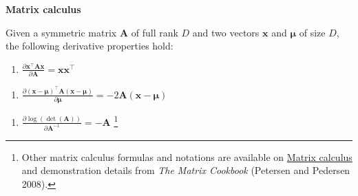 \hypertarget{properties-calculus}{}
\begin{blackbox}{\textbf{Matrix calculus}}

Given a symmetric matrix \(\boldsymbol{A}\) of full rank \(D\) and two vectors
\(\boldsymbol{x}\) and \(\boldsymbol{\mu}\) of size \(D\), the following derivative
properties hold:

\begin{cols}

\begin{col}{0.3\textwidth}

\begin{enumerate}
\def\labelenumi{\alph{enumi}.}
\tightlist
\item
  \(\frac{\partial \boldsymbol{x}^\top \boldsymbol{A} \boldsymbol{x}}{\partial \boldsymbol{A}} = \boldsymbol{x} \boldsymbol{x}^\top\)
\end{enumerate}

\end{col}

\begin{col}{0.3\textwidth}

\begin{enumerate}
\def\labelenumi{\alph{enumi}.}
\setcounter{enumi}{1}
\tightlist
\item
  \(\frac{\partial (\boldsymbol{x}-\boldsymbol{\mu})^\top \boldsymbol{A} (\boldsymbol{x}-\boldsymbol{\mu})}{\partial \boldsymbol{\mu}} = -2 \boldsymbol{A}(\boldsymbol{x}-\boldsymbol{\mu})\)
\end{enumerate}

\end{col}

\begin{col}{0.3\textwidth}

\begin{enumerate}
\def\labelenumi{\alph{enumi}.}
\setcounter{enumi}{2}
\tightlist
\item
  \(\frac{\partial \log\left(\operatorname{det}(\boldsymbol{A})\right)}{\partial \boldsymbol{A}^{-1}} = -\boldsymbol{A}\)
  \footnote{Other matrix calculus formulas and notations are available on \href{https://en.wikipedia.org/wiki/Matrix_calculus\#Scalar-by-vector}{Matrix
    calculus}
    and demonstration details from \emph{The Matrix Cookbook} (Petersen and Pedersen 2008).}
\end{enumerate}

\end{col}

\end{cols}

\end{blackbox}

